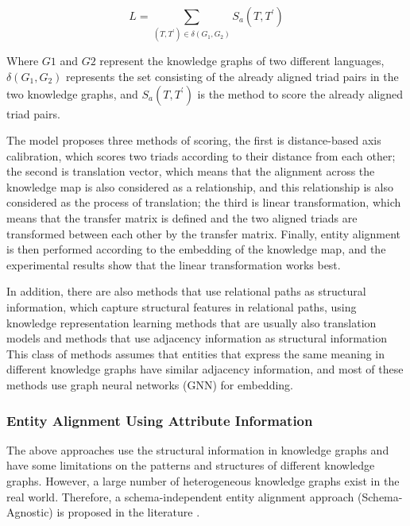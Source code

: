 \documentclass[sigconf]{acmart}
\begin{document}
{\begin{equation}
    L=\sum_{\left(T, T^{\prime}\right) \in \delta\left(G_{1}, G_{2}\right)} S_{a}\left(T, T^{\prime}\right)
\end{equation}

Where $G1$ and $G2$ represent the knowledge graphs of two different languages, $\delta\left(G_{1}, G_{2}\right)$ represents the set consisting of the already aligned triad pairs in the two knowledge graphs, and $S_{a}\left(T, T^{\prime}\right)$ is the method to score the already aligned triad pairs.

The model proposes three methods of scoring, the first is distance-based axis calibration, which scores two triads according to their distance from each other; the second is translation vector, which means that the alignment across the knowledge map is also considered as a relationship, and this relationship is also considered as the process of translation; the third is linear transformation, which means that the transfer matrix is defined and the two aligned triads are transformed between each other by the transfer matrix. Finally, entity alignment is then performed according to the embedding of the knowledge map, and the experimental results show that the linear transformation works best.

In addition, there are also methods that use relational paths as structural information, which capture structural features in relational paths, using knowledge representation learning methods that are usually also translation models and methods that use adjacency information as structural information This class of methods assumes that entities that express the same meaning in different knowledge graphs have similar adjacency information, and most of these methods use graph neural networks (GNN) \cite{scarselli2008graph} for embedding.

\subsubsection{Entity Alignment Using Attribute Information}

The above approaches use the structural information in knowledge graphs and have some limitations on the patterns and structures of different knowledge graphs. However, a large number of heterogeneous knowledge graphs exist in the real world. Therefore, a schema-independent entity alignment approach (Schema-Agnostic) is proposed in the literature \cite{teong2020schema}.

}
\end{document}
